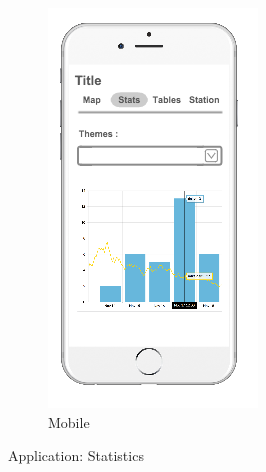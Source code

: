 \begin{figure}[ht]
\begin{subfigure}[b]{0.2\textwidth}
    \includegraphics[width=\textwidth]
      {img/c02-application/png/mobile-website-stats.png}
    \caption{Mobile}
  \end{subfigure}
  \caption{Application: Statistics}
\end{figure}


